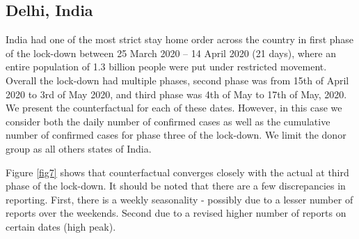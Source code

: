 \documentclass[preprint,authoryear,12pt]{elsarticle}
\begin{document}
	\subsection{Delhi, India}
	India had one of the most strict stay home order across the country in first phase of the lock-down between 25 March 2020 – 14 April 2020 (21 days), where an entire population of 1.3 billion people were put under restricted movement. Overall the lock-down had multiple phases, second phase was from 15th of April 2020 to 3rd of May 2020, and third phase was 4th of May to 17th of May, 2020. We present the counterfactual for each of these dates. However, in this case we consider both the daily number of confirmed cases as well as the cumulative number of confirmed cases for phase three of the lock-down. We limit the donor group as all others states of India.
	
	Figure \ref{fig7} shows that counterfactual converges closely with the actual at third phase of the lock-down.  It should be noted that there are a few discrepancies in reporting. First, there is a weekly seasonality - possibly due to a lesser number of reports over the weekends. Second due to a revised higher number of reports on certain dates (high peak).
	
\end{document}
